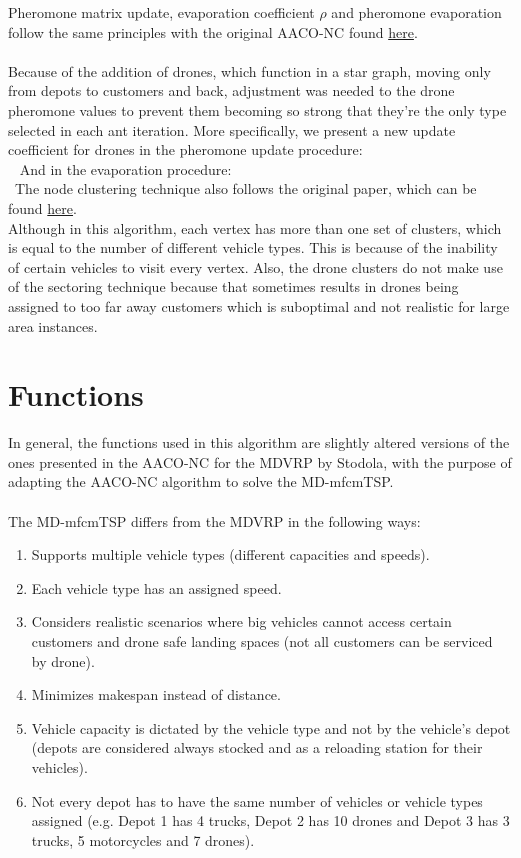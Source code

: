 \documentclass{article}
\begin{document}
	Pheromone matrix update, evaporation coefficient $\rho$ and pheromone evaporation follow the same principles with the original AACO-NC found \href{https://ieeexplore.ieee.org/abstract/document/9991848}{here}.\\\\
	\newline
	Because of the addition of drones, which function in a star graph, moving only from depots to customers and back, adjustment was needed to the drone pheromone values to prevent them becoming so strong that they're the only type selected in each ant iteration. More specifically, we present a new update coefficient for drones in the pheromone update procedure:\\
	\
	\newline
	And in the evaporation procedure:\\
	\
	The node clustering technique also follows the original paper, which can be found 
	\href{https://www.inderscienceonline.com/doi/abs/10.1504/IJBIC.2016.078639}{here}.\\
	Although in this algorithm, each vertex has more than one set of clusters, which is equal to the number of different vehicle types. This is because of the inability of certain vehicles to visit every vertex.
	Also, the drone clusters do not make use of the sectoring technique because that sometimes results in drones being assigned to too far away customers which is suboptimal and not realistic for large area instances.
	
	
	\section{Functions}
	
	In general, the functions used in this algorithm are slightly altered versions of the ones presented in the AACO-NC for the MDVRP by Stodola, with the purpose of adapting the AACO-NC algorithm to solve the MD-mfcmTSP.\\\\
	The MD-mfcmTSP differs from the MDVRP in the following ways:\\
	\begin{enumerate}
		\item Supports multiple vehicle types (different capacities and speeds).\
		\item Each vehicle type has an assigned speed.\
		\item Considers realistic scenarios where big vehicles cannot access certain customers and drone safe landing spaces (not all customers can be serviced by drone).\
		\item Minimizes makespan instead of distance.\
		\item Vehicle capacity is dictated by the vehicle type and not by the vehicle's depot (depots are considered always stocked and as a reloading station for their vehicles).\
		\item Not every depot has to have the same number of vehicles or vehicle types assigned (e.g. Depot 1 has 4 trucks, Depot 2 has 10 drones and Depot 3 has 3 trucks, 5 motorcycles and 7 drones).\
		
	\end{enumerate}
\end{document}
